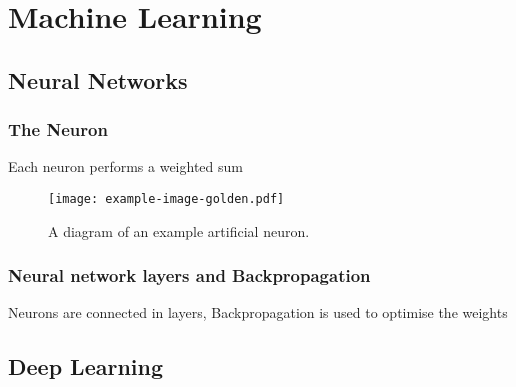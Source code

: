 
\chapter{Machine Learning}


\section{Neural Networks}

\subsection{The Neuron}

\begin{todo}
	Each neuron performs a weighted sum 
\end{todo}

\begin{figure}[htbp]
	\centering
	\texttt{[image: example-image-golden.pdf]}
	\caption{A diagram of an example artificial neuron.}
	\label{fig:neuron-example}
\end{figure}

\subsection{Neural network layers and Backpropagation}

\begin{todo}
	Neurons are connected in layers, Backpropagation is used to optimise the weights
\end{todo}

\section{Deep Learning}

